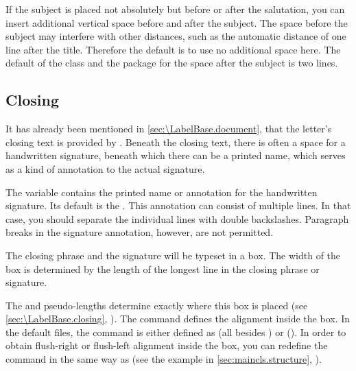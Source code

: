 \begin{Declaration}
\end{Declaration}
%
If the subject is placed not absolutely but before or after the salutation,
you can insert additional vertical space before and after the subject. The
space before the subject may interfere with other distances, such as the
automatic distance of one line after the title. Therefore the default is to
use no additional space here. The default of the class and the package for the
space after the subject is two lines.%
\EndIndexGroup
%
\EndIndexGroup


\subsection{Closing}
\BeginIndexGroup
{}

%
%
%

It has already been mentioned in \autoref{sec:\LabelBase.document},
 that the letter's closing text is
provided by . Beneath the
closing text, there is often a space for a handwritten signature, beneath
which there can be a printed name, which serves as a kind of annotation to the
actual signature.


\begin{Declaration}
\end{Declaration}
The  variable contains the printed name or annotation for
the handwritten signature. Its default  is the
. This annotation can
consist of multiple lines. In that case, you should separate the individual
lines with double backslashes. Paragraph breaks in the
signature annotation, however, are not permitted.%
\EndIndexGroup


\begin{Declaration}
\end{Declaration}
The closing phrase and the signature will be typeset in a box. The width of
the box is determined by the length of the longest line in the closing
phrase or signature.

The  and
 pseudo-lengths determine
exactly where this box is placed (see \autoref{sec:\LabelBase.closing},
). The 
command defines the alignment inside the box. In the default  files,
the command is either defined as  (all besides
) or  (). In order to
obtain flush-right or flush-left alignment inside the box, you can redefine
the command in the same way as  (see the
example in \autoref{sec:maincls.structure},
).

